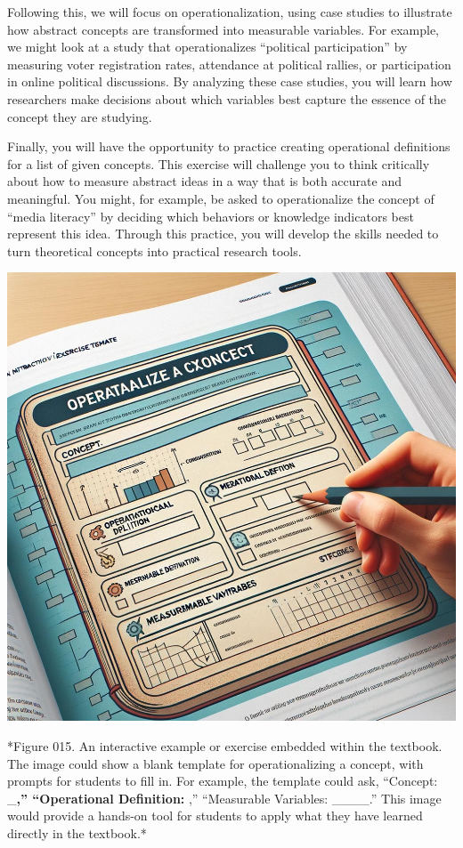 \documentclass[
]{book}
\begin{document}
Following this, we will focus on operationalization, using case studies to illustrate how abstract concepts are transformed into measurable variables. For example, we might look at a study that operationalizes ``political participation'' by measuring voter registration rates, attendance at political rallies, or participation in online political discussions. By analyzing these case studies, you will learn how researchers make decisions about which variables best capture the essence of the concept they are studying.

Finally, you will have the opportunity to practice creating operational definitions for a list of given concepts. This exercise will challenge you to think critically about how to measure abstract ideas in a way that is both accurate and meaningful. You might, for example, be asked to operationalize the concept of ``media literacy'' by deciding which behaviors or knowledge indicators best represent this idea. Through this practice, you will develop the skills needed to turn theoretical concepts into practical research tools.

\includegraphics[width=1\linewidth,height=\textheight,keepaspectratio]{images/fig015.jpg}

*Figure 015. An interactive example or exercise embedded within the textbook. The image could show a blank template for operationalizing a concept, with prompts for students to fill in. For example, the template could ask, ``Concept: \_\textbf{,'' ``Operational Definition: },'' ``Measurable Variables: \_\_\_\_.'' This image would provide a hands-on tool for students to apply what they have learned directly in the textbook.*
\end{document}
